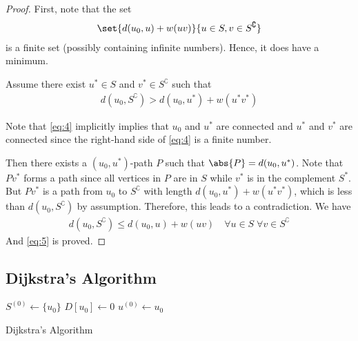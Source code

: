 \documentclass[thmcnt=section, 12pt, color=cyan]{my-elegantbook}
\begin{document}
\begin{proof}
    First, note that the set 
    \begin{align*}
        \set{d(u_0, u) + w(u v)}{u \in S, v \in S^\complement}
    \end{align*}
    is a finite set (possibly containing infinite numbers). Hence, it does have a minimum. 

    Assume there exist $u^\ast \in S$ and $v^\ast \in S^\complement$ such that 
    \begin{align}
        d(u_0, S^\complement)
        > d(u_0, u^\ast) + w(u^\ast v^\ast)
        \label{eq:4}
    \end{align}
    \begin{note}
        Note that \eqref{eq:4} implicitly implies that $u_0$ and $u^\ast$ are connected and $u^\ast$ and $v^\ast$ are connected since the right-hand side of \eqref{eq:4} is a finite number.
    \end{note}
    \noindent Then there exists a $(u_0, u^\ast)$-path $P$ such that $\abs{P} = d(u_0, u^\ast)$. Note that $P v^\ast$ forms a path since all vertices in $P$ are in $S$ while $v^\ast$ is in the complement $S^\ast$. But $P v^\ast$ is a path from $u_0$ to $S^\complement$ with length $d(u_0, u^\ast) + w(u^\ast v^\ast)$, which is less than $d(u_0, S^\complement)$ by assumption. Therefore, this leads to a contradiction. We have 
    \begin{align*}
        d(u_0, S^\complement)
        \leq d(u_0, u) + w(u v)
        \quad
        \forall u \in S \; 
        \forall v \in S^\complement
    \end{align*}
    And \eqref{eq:5} is proved.
\end{proof}



\subsection{Dijkstra's Algorithm}

\begin{algorithm}[ht]
    $S^{(0)} \gets \{u_0\}$ \;
    $D[u_0] \gets 0$ \; 
    $u^{(0)} \gets u_0$ \;
    \caption{Dijkstra's Algorithm}
    \label{alg:3}
\end{algorithm}
\end{document}

